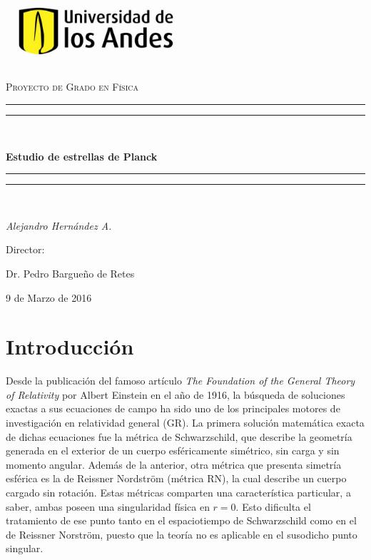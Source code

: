 \documentclass{article}
\numberwithin{equation}{section}
\theoremstyle{definition}
\begin{document}
\begin{titlepage}
	\centering
	\vspace*{\baselineskip} 
	\includegraphics[width=0.5\textwidth]{logo_uniandes}\par\vspace{1cm}
	{\scshape\Large Proyecto de Grado en Física\par}
	\vspace{1.5cm}
	\rule{\textwidth}{1.6pt}\vspace*{-\baselineskip}\vspace*{2pt}
	\rule{\textwidth}{0.4pt}\\[\baselineskip]
	{\huge\bfseries Estudio de estrellas de Planck\par}
	\rule{\textwidth}{0.4pt}\vspace*{-\baselineskip}\vspace{3.2pt}
	\rule{\textwidth}{1.6pt}\\[\baselineskip]
	\vspace{2cm}
	{\Large\itshape Alejandro Hernández A.\par}
	\vfill
	Director:\par
	Dr. Pedro Bargueño de Retes 
	\vfill

	{\large 9 de Marzo de 2016\par}
\end{titlepage}

\newpage
\large
\tableofcontents
\newpage

\normalsize
\section{Introducción}

Desde la publicación del famoso artículo \textit{The Foundation of the General Theory of Relativity} %
por Albert Einstein en el año de 1916, la búsqueda de soluciones exactas a sus ecuaciones de campo ha sido uno de los principales motores de investigación en relatividad general (GR). La primera solución matemática exacta de dichas ecuaciones fue la métrica de Schwarzschild, que describe la geometría generada en el exterior de un cuerpo esféricamente simétrico, sin carga y sin momento angular. Además de la anterior, otra métrica que presenta simetría esférica es la de Reissner Nordström (métrica RN), la cual describe un cuerpo cargado sin rotación. Estas métricas comparten una característica particular, a saber, ambas poseen una singularidad física en $r = 0$. Esto dificulta el tratamiento de ese punto tanto en el espaciotiempo de Schwarzschild como en el de Reissner Norström, puesto que la teoría no es aplicable en el susodicho punto singular.\\
\end{document}
